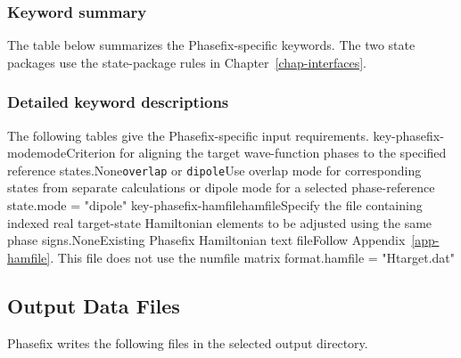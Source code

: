 \subsubsection*{Keyword summary}
The table below summarizes the Phasefix-specific keywords. The two state packages use the state-package rules in Chapter~\ref{chap-interfaces}.
\begin{keywordoverview}
\end{keywordoverview}
\subsubsection*{Detailed keyword descriptions}
The following tables give the Phasefix-specific input requirements.
\keyword
{key-phasefix-mode}{mode}{Criterion for aligning the target wave-function phases to the specified reference states.}{\OpRequired}{\OpString}{None}{\texttt{overlap} or \texttt{dipole}}{Use overlap mode for corresponding states from separate calculations or dipole mode for a selected phase-reference state.}{mode = "dipole"}
\keyword
{key-phasefix-hamfile}{hamfile}{Specify the file containing indexed real target-state Hamiltonian elements to be adjusted using the same phase signs.}{\OpOptional}{\OpString}{None}{Existing Phasefix Hamiltonian text file}{Follow Appendix~\ref{app-hamfile}. This file does not use the numfile matrix format.}{hamfile = "Htarget.dat"}

\subsection{Output Data Files}
Phasefix writes the following files in the selected output directory.

\par\vspace{0.55\baselineskip}

